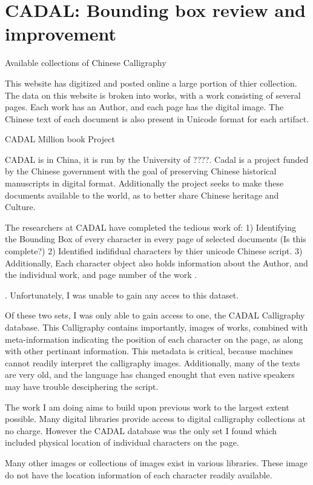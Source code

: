 \chapter{CADAL: Bounding box review and improvement}
Available collections of Chinese Calligraphy

This website has digitized and posted online a large portion of thier collection.  The data on this website is broken into works, with a work consisting of several pages.  Each work has an Author, and each page has the digital image.  The Chinese text of each document is also present in Unicode format for each artifact.


CADAL Million book Project

CADAL is in China, it is run by the University of ????.  Cadal is a project funded by the Chinese government with the goal of preserving Chinese historical manuscripts in digital format.  Additionally the project seeks to make these documents available to the world, as to better share Chinese heritage and Culture.

The researchers at CADAL have completed the tedious work of:
1) Identifying the Bounding Box of every character in every page of selected documents (Is this complete?)
2) Identified indifidual characters by thier unicode Chinese script.
3) Additionally, Each character object also holds information about the Author, and the individual work, and page number of the work .

.  Unfortunately, I was unable to gain any acces to this dataset.

    Of these two sets, I was only able to gain access to one, the CADAL Calligraphy database.  This Calligraphy contains importantly, images of works, combined with meta-information indicating the position of each character on the page, as along with other pertinant information.  This metadata is critical, because machines cannot readily interpret the calligraphy images.  Additionally, many of the texts are very old, and the language has changed enought that even native speakers may have trouble desciphering the script.

The work I am doing aims to build upon previous work to the largest extent possible.  Many digital libraries provide access to digital calligraphy collections at no charge.  However the CADAL database was the only set I found which included physical location of individual characters on the page.

   Many other images or collections of images exist in various libraries.  These image do not have the location information of each character readily available.

